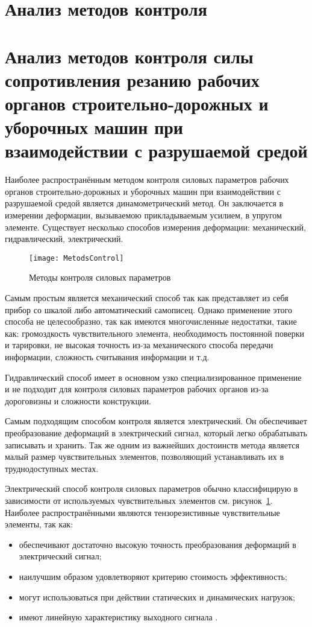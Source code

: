 \section{Анализ методов контроля} \label{sect1_2}
\section{Анализ методов контроля силы сопротивления резанию рабочих органов строительно-дорожных и уборочных машин при взаимодействии с разрушаемой средой} \label{sect1_3}
Наиболее распространённым методом контроля силовых параметров рабочих органов строительно-дорожных и уборочных машин при взаимодействии с разрушаемой средой является динамометрический метод. Он заключается в измерении деформации, вызываемою прикладываемым усилием, в упругом элементе. Существует несколько способов измерения деформации: механический, гидравлический, электрический.
\begin{figure}[ht] 
	\center
	\texttt{[image: MetodsControl]}
	\caption{Методы контроля силовых параметров} 
	\label{img:MetodsControl}  
\end{figure}

Самым простым является механический способ так как представляет из себя прибор со шкалой либо автоматический самописец. Однако применение этого способа не целесообразно, так как имеются многочисленные недостатки, такие как: громоздкость чувствительного элемента, необходимость постоянной поверки и тарировки, не высокая точность из-за механического способа передачи информации, сложность считывания информации и т.д.

Гидравлический способ имеет в основном узко специализированное применение и не подходит для контроля силовых параметров рабочих органов из-за дороговизны и сложности конструкции.

Самым подходящим способом контроля является электрический. Он обеспечивает преобразование деформаций в электрический сигнал, который легко обрабатывать записывать и хранить. Так же одним из важнейших достоинств метода является малый размер чувствительных элементов, позволяющий устанавливать их в труднодоступных местах.

Электрический способ контроля силовых параметров обычно классифицирую в зависимости от используемых чувствительных элементов см. рисунок~\ref{img:MetodsControl}. Наиболее распространёнными являются тензорезистивные чувствительные элементы, так как:
\begin{itemize}
	\item обеспечивают достаточно высокую точность преобразования деформаций в электрический сигнал;
	\item наилучшим образом удовлетворяют критерию стоимость эффективность;
	\item могут использоваться при действии статических и динамических нагрузок;
	\item имеют линейную характеристику выходного сигнала \todo{[91]}.
\end{itemize}

